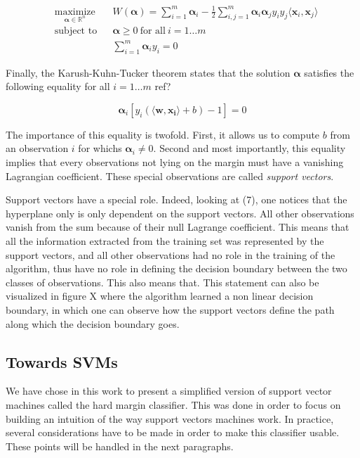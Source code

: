 \begin{equation}
  \begin{aligned}
    &\underset{\boldsymbol{\alpha} \in \mathbb{R}^n} {\text{maximize}}
    & & W(\boldsymbol{\alpha}) = \sum_{i=1}^m\boldsymbol{\alpha}_i - \frac{1}{2}\sum_{i,j=1}^m\boldsymbol{\alpha}_i\boldsymbol{\alpha}_jy_iy_j\langle\mathbf{x}_i, \mathbf{x}_j\rangle\\
    &\text{subject to}
    & &\boldsymbol{\alpha} \ge 0\ \text{for all}\ i = 1 \dotsc m\\
    & & &\sum^m_{i=1} \boldsymbol{\alpha}_iy_i = 0
  \end{aligned}
\end{equation}

Finally, the Karush-Kuhn-Tucker theorem states that the solution $\boldsymbol{\alpha}$ satisfies the following equality for all $i = 1\dotsc m$
\textcolor[rgb]{1,0,0}{ref?}

\begin{equation}
  \boldsymbol{\alpha}_i[y_i(\langle \mathbf{w}, \mathbf{x_i}\rangle + b) - 1] = 0
\end{equation}

The importance of this equality is twofold. First, it allows us to compute $b$ from an observation $i$ for whichs $\boldsymbol{\alpha}_i \neq 0$. Second and most importantly, this equality implies that every observations not lying on the margin must have a vanishing Lagrangian coefficient. These special observations are called \textit{support vectors}.

Support vectors have a special role. Indeed, looking at (7), one notices that the hyperplane only is only dependent on the support vectors. All other observations vanish from the sum because of their null Lagrange coefficient. This means that all the information extracted from the training set was represented by the support vectors, and all other observations had no role in the training of the algorithm, thus have no role in defining the decision boundary between the two classes of observations. This also means that. This statement can also be visualized in figure X where the algorithm learned a non linear decision boundary, in which one can observe how the support vectors define the path along which the decision boundary goes.

\subsection{Towards SVMs}

We have chose in this work to present a simplified version of support vector machines called the hard margin classifier. This was done in order to focus on building an intuition of the way support vectors machines work. In practice, several considerations have to be made in order to make this classifier usable. These points will be handled in the next paragraphs.

